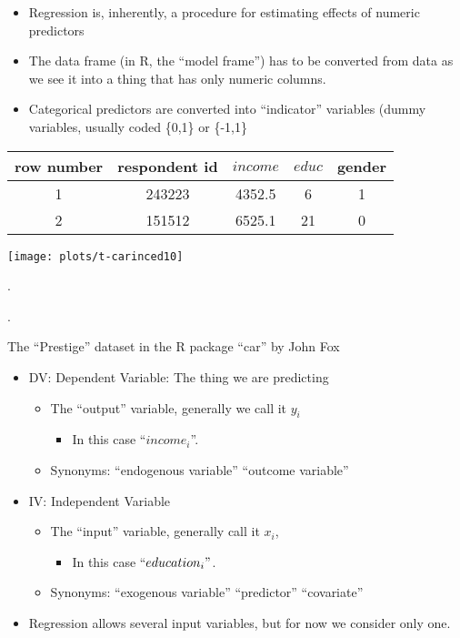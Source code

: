 \documentclass[10pt,english]{beamer}
\providecommand{\tabularnewline}{\\}
\def\lyxframeend{} %
\begin{document}
\lyxframeend{}
\begin{itemize}
\item Regression is, inherently, a procedure for estimating effects of numeric
predictors
\item The data frame (in R, the ``model frame'') has to be converted from
data as we see it into a thing that has only numeric columns.
\item Categorical predictors are converted into ``indicator'' variables
(dummy variables, usually coded \{0,1\} or \{-1,1\}
\end{itemize}
\begin{center}
\begin{tabular}{|c|c|c|c|c|}
\hline 
row number &
respondent id &
$income$ &
$educ$  &
gender\tabularnewline
\hline 
\hline 
1 &
243223 &
4352.5 &
6 &
1\tabularnewline
\hline 
2 &
151512 &
6525.1 &
21 &
0\tabularnewline
\hline 
\end{tabular}
\par\end{center}


\lyxframeend{}

\begin{center}
\par\end{center}

\texttt{[image: plots/t-carinced10]}

.

.

The ``Prestige'' dataset in the R package ``car'' by John Fox


\lyxframeend{}
\begin{itemize}
\item DV: Dependent Variable: The thing we are predicting

\begin{itemize}
\item The ``output'' variable, generally we call it $y_{i}$

\begin{itemize}
\item In this case ``$income_{i}$''.
\end{itemize}
\item Synonyms: ``endogenous variable'' ``outcome variable''
\end{itemize}
\item IV: Independent Variable

\begin{itemize}
\item The ``input'' variable, generally call it $x_{i}$, 

\begin{itemize}
\item In this case ``$education_{i}"$.
\end{itemize}
\item Synonyms: ``exogenous variable'' ``predictor'' ``covariate''
\end{itemize}
\item Regression allows several input variables, but for now we consider
only one.
\end{itemize}
\end{document}
